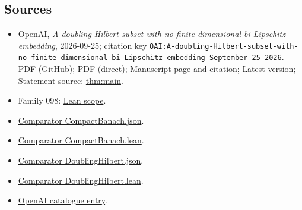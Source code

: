 \documentclass[11pt]{article}
\begin{document}
\subsection{Sources}
\begin{itemize}
\item OpenAI, \emph{A doubling Hilbert subset with no finite-dimensional bi-Lipschitz embedding}, 2026-09-25; citation key \texttt{OAI:A-doubling-Hilbert-subset-with-no-finite-dimensional-bi-Lipschitz-embedding-September-25-2026}. \href{https://github.com/openai/math/blob/adc7f1241b42e322a6451854ab7e4b4c146bf78a/preprints/A-doubling-Hilbert-subset-with-no-finite-dimensional-bi-Lipschitz-embedding-September-25-2026/main.pdf}{PDF (GitHub)}; \href{https://github.com/openai/math/raw/adc7f1241b42e322a6451854ab7e4b4c146bf78a/preprints/A-doubling-Hilbert-subset-with-no-finite-dimensional-bi-Lipschitz-embedding-September-25-2026/main.pdf}{PDF (direct)}; \href{https://github.com/openai/math/blob/adc7f1241b42e322a6451854ab7e4b4c146bf78a/preprints/A-doubling-Hilbert-subset-with-no-finite-dimensional-bi-Lipschitz-embedding-September-25-2026/README.md}{Manuscript page and citation}; \href{https://github.com/openai/math/blob/main/preprints/A-doubling-Hilbert-subset-with-no-finite-dimensional-bi-Lipschitz-embedding-September-25-2026/main.pdf}{Latest version}; Statement source: \href{https://github.com/openai/math/blob/adc7f1241b42e322a6451854ab7e4b4c146bf78a/preprints/A-doubling-Hilbert-subset-with-no-finite-dimensional-bi-Lipschitz-embedding-September-25-2026/build/main.tex\#L47}{thm:main}.
\item Family 098: \href{https://github.com/openai/math/blob/adc7f1241b42e322a6451854ab7e4b4c146bf78a/lean/docs/098.md}{Lean scope}.
\item \href{https://github.com/openai/math/blob/adc7f1241b42e322a6451854ab7e4b4c146bf78a/lean/ComparatorChallenges/CompactBanach.json}{Comparator CompactBanach.json}.
\item \href{https://github.com/openai/math/blob/adc7f1241b42e322a6451854ab7e4b4c146bf78a/lean/ComparatorChallenges/CompactBanach.lean}{Comparator CompactBanach.lean}.
\item \href{https://github.com/openai/math/blob/adc7f1241b42e322a6451854ab7e4b4c146bf78a/lean/ComparatorChallenges/DoublingHilbert.json}{Comparator DoublingHilbert.json}.
\item \href{https://github.com/openai/math/blob/adc7f1241b42e322a6451854ab7e4b4c146bf78a/lean/ComparatorChallenges/DoublingHilbert.lean}{Comparator DoublingHilbert.lean}.
\item \href{https://github.com/openai/math/blob/adc7f1241b42e322a6451854ab7e4b4c146bf78a/CONTENTS.md}{OpenAI catalogue entry}.
\end{itemize}
\end{document}
